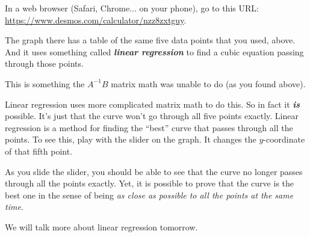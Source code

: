 \documentclass[10pt,letterpaper]{memoir}
\begin{document}
In a web browser (Safari, Chrome... on your phone), go to this URL:\\
\url{https://www.desmos.com/calculator/nzz8zxtguy}.

The graph there has a table of the same five data points that you used, above.
And it uses something called 
{\bfseries\itshape linear regression}
to find a cubic equation passing through those points.

This is something the $A^{-1}B$ matrix math was unable to do
(as you found above).

Linear regression uses more complicated matrix math 
to do this. 
So in fact it {\bfseries\itshape is} possible. 
It's just that the curve won't go through all five points exactly.
Linear regression is a method for finding the ``best'' curve that 
passes through all the points.
To see this, 
play with the slider on the graph. It changes the
$y$-coordinate of that fifth point. 

As you slide the slider,
you should be able to see that the curve no longer passes through 
all the points exactly.
Yet, it is possible to prove that the curve is the best one
in the sense of being {\itshape as close as possible to all the points
at the same time.}

We will talk more about linear regression tomorrow.
\end{document}
